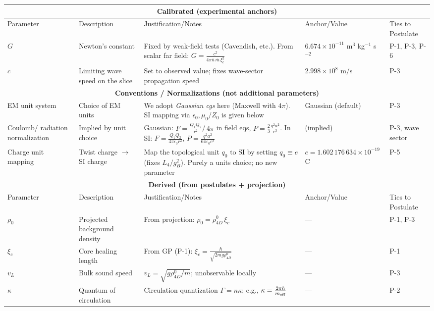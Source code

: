 \begin{table}[H]
\centering
\small
\begin{tabularx}{\linewidth}{|p{1.7cm}|p{3.2cm}|X|p{2.4cm}|p{2.1cm}|}
\hline
\multicolumn{5}{|c|}{\textbf{Calibrated (experimental anchors)}} \\
\hline
Parameter & Description & Justification/Notes & Anchor/Value & Ties to Postulate \\
\hline
$G$ & Newton's constant & Fixed by weak-field tests (Cavendish, etc.). From scalar far field: $G=\frac{c^2}{4\pi\bar n\,\bar m\,\xi_c^2}$ & $6.674\times10^{-11}$ m$^3$ kg$^{-1}$ s$^{-2}$ & P-1, P-3, P-6 \\
\hline
$c$ & Limiting wave speed on the slice & Set to observed value; fixes wave-sector propagation speed & $2.998\times10^{8}$ m/s & P-3 \\
\hline
\multicolumn{5}{|c|}{\textbf{Conventions / Normalizations (not additional parameters)}} \\
\hline
EM unit system & Choice of EM units & We adopt \emph{Gaussian cgs} here (Maxwell with $4\pi$). SI mapping via $\epsilon_0,\mu_0$/$Z_0$ is given below & Gaussian (default) & P-3 \\
\hline
Coulomb/ radiation normalization & Implied by unit choice & Gaussian: $F=\frac{Q_1Q_2}{r^2}$/$\,4\pi$ in field eqs, $P=\tfrac{2}{3}\frac{q^2 a^2}{c^3}$. In SI: $F=\frac{Q_1Q_2}{4\pi\epsilon_0 r^2}$, $P=\frac{q^2 a^2}{6\pi\epsilon_0 c^3}$ & (implied) & P-3, wave sector \\
\hline
Charge unit mapping & Twist charge $\to$ SI charge & Map the topological unit $q_0$ to SI by setting $q_0\equiv e$ (fixes $L_4/g_B^2$). Purely a units choice; no new parameter & $e=1.602\,176\,634\times10^{-19}$ C & P-5 \\
\hline
\multicolumn{5}{|c|}{\textbf{Derived (from postulates + projection)}} \\
\hline
Parameter & Description & Justification/Notes & Anchor/Value & Ties to Postulate \\
\hline
$\rho_0$ & Projected background density & From projection: $\rho_0=\rho_{4D}^0\,\xi_c$ & --- & P-1, P-3 \\
\hline
$\xi_c$ & Core healing length & From GP (P-1): $\xi_c=\frac{\hbar}{\sqrt{2mg\rho_{4D}^0}}$ & --- & P-1 \\
\hline
$v_L$ & Bulk sound speed & $v_L=\sqrt{g\rho_{4D}^0/m}$; unobservable locally & --- & P-3 \\
\hline
$\kappa$ & Quantum of circulation & Circulation quantization $\Gamma=n\kappa$; e.g., $\kappa=\frac{2\pi\hbar}{m_{\rm eff}}$ & --- & P-2 \\

\end{tabularx}
\end{table}
